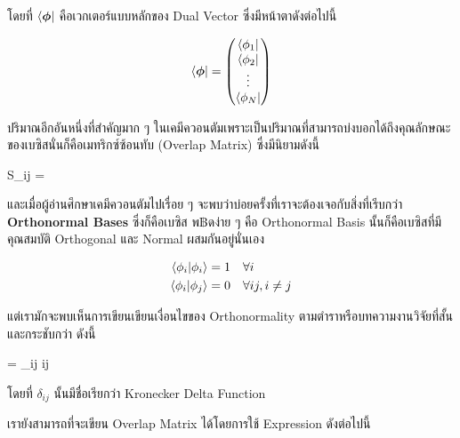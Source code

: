 \noindent โดยที่ $\bra{\boldsymbol \phi}$ คือเวกเตอร์แบบหลักของ Dual Vector ซึ่งมีหน้าตาดังต่อไปนี้

\begin{equation}
  \bra{\boldsymbol \phi}
  =
  \begin{pmatrix}
    \bra{\phi_1} \\
    \bra{\phi_2} \\
    \vdots       \\
    \bra{\phi_N}
  \end{pmatrix}
\end{equation}

ปริมาณอีกอันหนึ่งที่สำคัญมาก ๆ ในเคมีควอนตัมเพราะเป็นปริมาณที่สามารถบ่งบอกได้ถึงคุณลักษณะของเบซิสนั่นก็คือเมทริกซ์ซ้อนทับ (Overlap Matrix)
ซึ่งมีนิยามดังนี้

\begin{tcolorbox}
  S_{ij}
  =
\end{tcolorbox}

\noindent และเมื่อผู้อ่านศึกษาเคมีควอนตัมไปเรื่อย ๆ จะพบว่าบ่อยครั้งที่เราจะต้องเจอกับสิ่งที่เรีบกว่า \textbf{Orthonormal Bases}
ซึ่งก็คือเบซิส พ฿ดง่าย ๆ คือ Orthonormal Basis นั้นก็คือเบซิสที่มีคุณสมบัติ Orthogonal และ Normal ผสมกันอยู่นั่นเอง

\begin{equation}
  \begin{split}
    \braket{\phi_i}{\phi_i} &= 1 \quad \forall i \\
    \braket{\phi_i}{\phi_j} &= 0 \quad \forall ij, i \neq j
  \end{split}
\end{equation}

\noindent แต่เรามักจะพบเห็นการเขียนเขียนเงื่อนไขของ Orthonormality ตามตำราหรือบทความงานวิจัยที่สั้นและกระชับกว่า ดังนี้

\begin{tcolorbox}
  =
  \delta_{ij} \quad \forall ij
\end{tcolorbox}

\noindent โดยที่ $\delta_{ij}$ นั้นมีชื่อเรียกว่า Kronecker Delta Function

เรายังสามารถที่จะเขียน Overlap Matrix ได้โดยการใช้ Expression ดังต่อไปนี้

